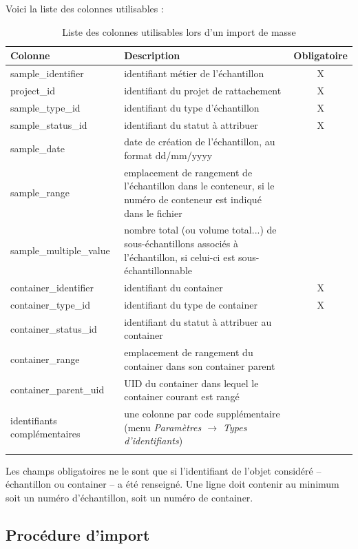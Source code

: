 Voici la liste des colonnes utilisables :
\begin{longtable}{|p{4cm}|p{8cm}| c|}
\hline
\textbf{Colonne} & \textbf{Description} & \textbf{Obligatoire} \\
\hline
\endhead
sample\_identifier & identifiant métier de l'échantillon & X \\
\hline
project\_id & identifiant du projet de rattachement & X \\
\hline
sample\_type\_id & identifiant du type d'échantillon & X \\
\hline
sample\_status\_id & identifiant du statut à attribuer & X \\
\hline
sample\_date & date de création de l'échantillon, au format dd/mm/yyyy & \\
\hline
sample\_range & emplacement de rangement de l'échantillon dans le conteneur, si le numéro de conteneur est indiqué dans le fichier & \\
\hline
sample\_multiple\_value & nombre total (ou volume total...) de sous-échantillons associés à l'échantillon, si celui-ci est sous-échantillonnable & \\
\hline
container\_identifier & identifiant du container & X \\
\hline
container\_type\_id & identifiant du type de container & X \\
\hline
container\_status\_id & identifiant du statut à attribuer au container & \\
\hline
container\_range & emplacement de rangement du container dans son container parent & \\
\hline
container\_parent\_uid & UID du container dans lequel le container courant est rangé & \\
\hline
identifiants complémentaires & une colonne par code supplémentaire (menu \textit{Paramètres $\rightarrow$ Types d'identifiants}) & \\
\hline

\caption{Liste des colonnes utilisables lors d'un import de masse}
\end{longtable}

Les champs obligatoires ne le sont que si l'identifiant de l'objet considéré -- échantillon ou container -- a été renseigné. Une ligne doit contenir au minimum soit un numéro d'échantillon, soit un numéro de container.

\subsection{Procédure d'import}

